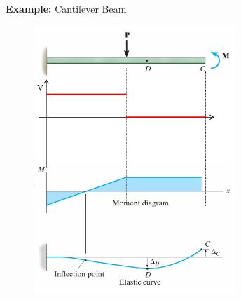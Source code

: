 \noindent \textbf{Example:} Cantilever Beam

\begin{figure}[!h]
\centering
\includegraphics[angle=0, width=3in]{Beam Deflection-Figures/cantilever Ex.png}
\vspace{-2mm}
\caption{\small {}}
\vspace{-3mm}
\label{Fig:CantileverEx}
\end{figure}

\clearpage

\subsection{}


